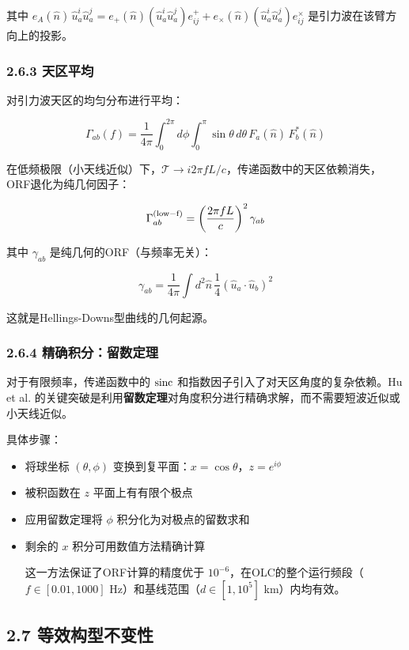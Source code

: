 \documentclass[12pt,a4paper]{article}
\begin{document}
其中 $e_A(\hat{n})\, \hat{u}_a^i \hat{u}_a^j = e_+(\hat{n}) (\hat{u}_a^i \hat{u}_a^j)e_{ij}^+ + e_\times(\hat{n}) (\hat{u}_a^i \hat{u}_a^j)e_{ij}^\times$ 是引力波在该臂方向上的投影。

\subsubsection{2.6.3 天区平均}


对引力波天区的均匀分布进行平均：

$$\Gamma_{ab}(f) = \frac{1}{4\pi} \int_0^{2\pi} d\phi \int_0^\pi \sin\theta\, d\theta\, F_a(\hat{n})\, F_b^*(\hat{n})$$

在低频极限（小天线近似）下，$\mathcal{T} \to i2\pi f L/c$，传递函数中的天区依赖消失，ORF退化为纯几何因子：

$$\Gamma_{ab}^{\rm (low-f)} = \left(\frac{2\pi f L}{c}\right)^2 \gamma_{ab}$$

其中 $\gamma_{ab}$ 是纯几何的ORF（与频率无关）：

$$\gamma_{ab} = \frac{1}{4\pi} \int d^2\hat{n}\, \frac{1}{4}(\hat{u}_a \cdot \hat{u}_b)^2$$

这就是Hellings-Downs型曲线的几何起源。

\subsubsection{2.6.4 精确积分：留数定理}


对于有限频率，传递函数中的 ${\rm sinc}$ 和指数因子引入了对天区角度的复杂依赖。Hu et al. 的关键突破是利用\textbf{留数定理}对角度积分进行精确求解，而不需要短波近似或小天线近似。

具体步骤：
\begin{itemize}
  \item[1] 将球坐标 $(\theta, \phi)$ 变换到复平面：$x = \cos\theta$，$z = e^{i\phi}$
  \item[2] 被积函数在 $z$ 平面上有有限个极点
  \item[3] 应用留数定理将 $\phi$ 积分化为对极点的留数求和
  \item[4] 剩余的 $x$ 积分可用数值方法精确计算

这一方法保证了ORF计算的精度优于 $10^{-6}$，在OLC的整个运行频段（$f \in [0.01, 1000]$ Hz）和基线范围（$d \in [1, 10^5]$ km）内均有效。

\end{itemize}
\subsection{2.7 等效构型不变性}
\end{document}
